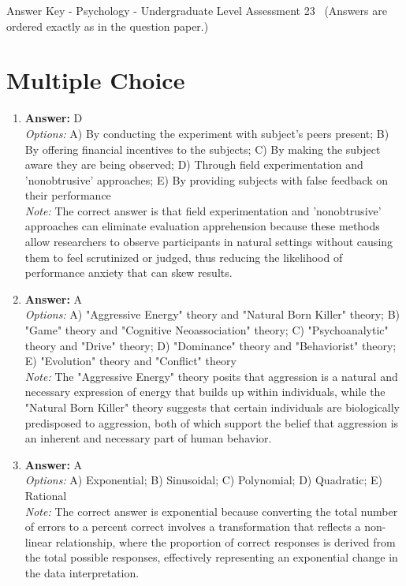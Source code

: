 \documentclass[12pt]{article}
\begin{document}
\begin{center}
Answer Key - Psychology - Undergraduate Level Assessment 23 \
\small (Answers are ordered exactly as in the question paper.)
\end{center}

\section*{Multiple Choice}
\begin{enumerate}[label=\arabic*.]
\item \textbf{Answer:} D
\\ \textit{Options:} A) By conducting the experiment with subject's peers present; B) By offering financial incentives to the subjects; C) By making the subject aware they are being observed; D) Through field experimentation and 'nonobtrusive' approaches; E) By providing subjects with false feedback on their performance
\\ \textit{Note:} The correct answer is that field experimentation and 'nonobtrusive' approaches can eliminate evaluation apprehension because these methods allow researchers to observe participants in natural settings without causing them to feel scrutinized or judged, thus reducing the likelihood of performance anxiety that can skew results.
\item \textbf{Answer:} A
\\ \textit{Options:} A) "Aggressive Energy" theory and "Natural Born Killer" theory; B) "Game" theory and "Cognitive Neoassociation" theory; C) "Psychoanalytic" theory and "Drive" theory; D) "Dominance" theory and "Behaviorist" theory; E) "Evolution" theory and "Conflict" theory
\\ \textit{Note:} The "Aggressive Energy" theory posits that aggression is a natural and necessary expression of energy that builds up within individuals, while the "Natural Born Killer" theory suggests that certain individuals are biologically predisposed to aggression, both of which support the belief that aggression is an inherent and necessary part of human behavior.
\item \textbf{Answer:} A
\\ \textit{Options:} A) Exponential; B) Sinusoidal; C) Polynomial; D) Quadratic; E) Rational
\\ \textit{Note:} The correct answer is exponential because converting the total number of errors to a percent correct involves a transformation that reflects a non-linear relationship, where the proportion of correct responses is derived from the total possible responses, effectively representing an exponential change in the data interpretation.

\end{enumerate}
\end{document}
